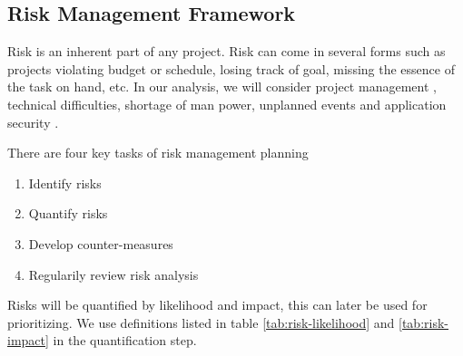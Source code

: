 \subsection{Risk Management Framework}

Risk is an inherent part of any project. Risk can come in several forms such as
projects violating budget or schedule, losing track of goal, missing the
essence of the task on hand, etc. In our analysis, we will consider project
management , technical difficulties, shortage of man power, unplanned events
and application security .\cite{wiki:rmf1}

There are four key tasks of risk management planning\cite{wiki:rmf2}
\begin{enumerate}
    \item{Identify risks}
	\item{Quantify risks}
	\item{Develop counter-measures}
    \item{Regularily review risk analysis}
\end{enumerate}

Risks will be quantified by likelihood and impact, this can later be used for
prioritizing. We use definitions listed in table \ref{tab:risk-likelihood} and
\ref{tab:risk-impact} in the quantification step.

